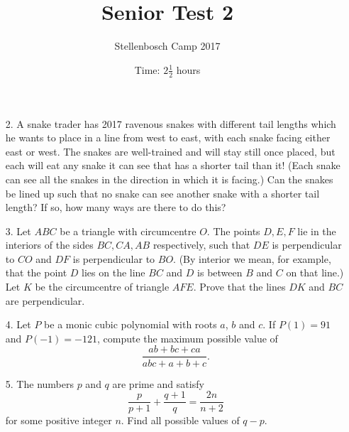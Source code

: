 \documentclass{article}
\title{Senior Test 2}
\author{Stellenbosch Camp 2017}
\date{Time: $2\frac{1}{2}$ hours}
\begin{document}
 \maketitle

\begin{enumerate}

\item[2.] %
A snake trader has 2017 ravenous snakes with different tail lengths which he wants to place in a line from west to east, with each snake facing either east or west. The snakes are well-trained and will stay still once placed, but each will eat any snake it can see that has a shorter tail than it! (Each snake can see all the snakes in the direction in which it is facing.) Can the snakes be lined up such that no snake can see another snake with a shorter tail length? If so, how many ways are there to do this?

\item[3.] %
Let $ABC$ be a triangle with circumcentre $O$. The points $D,E,F$ lie in the interiors of the sides $BC,CA,AB$ respectively, such that $DE$ is perpendicular to $CO$ and $DF$ is perpendicular to $BO$. (By interior we mean, for example, that the point $D$ lies on the line $BC$ and $D$ is between $B$ and $C$ on that line.) Let $K$ be the circumcentre of triangle $AFE$. Prove that the lines $DK$ and $BC$ are perpendicular.

\item[4.] %
Let $P$ be a monic cubic polynomial with roots $a$, $b$ and $c$. If $P(1) = 91$ and $P(-1) = -121$, compute the maximum possible value of
	\[\frac{ab+bc+ca}{abc+a+b+c}.\]

\item[5.] %
The numbers $p$ and $q$ are prime and satisfy
	\[\frac{p}{{p + 1}} + \frac{{q + 1}}{q} = \frac{{2n}}{{n + 2}}\]
for some positive integer $n$. Find all possible values of $q-p$.

\end{enumerate}
\end{document}
